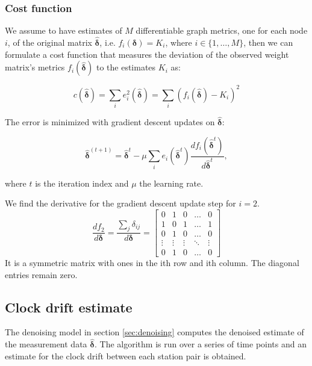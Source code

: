 \documentclass[12pt,a4paper,english]{article}
\begin{document}
\subsubsection{Cost function}
We assume to have estimates of $M$ differentiable graph metrics, one for each node $i$, of the original matrix $\bm{\hat{\delta}}$, i.e. $f_i(\bm{\delta}) = K_i$, where $i\in\{ 1,\dots, M \}$, then we can formulate a cost function that measures the deviation of the observed weight matrix's metrics $f_i(\bm{\hat{\delta}})$ to the estimates $K_i$ as: 

\begin{equation}
c(\bm{\hat{\delta}}) = \sum_i e_i^2(\bm{\hat{\delta}}) = \sum_i(f_i(\bm{\hat{\delta}})-K_i)^2
\end{equation}

The error is minimized with gradient descent updates on $\bm{\hat{\delta}}$: 

\begin{equation}
\bm{\hat{\delta}}^{(t+1)} = \bm{\hat{\delta}}^t-\mu\sum_i e_i(\bm{\hat{\delta}}^t)\frac{df_i(\bm{\hat{\delta}}^t)}{d\bm{\hat{\delta}}^t},
\label{eq:updates}
\end{equation}

where $t$ is the iteration index and $\mu$ the learning rate. %

We find the derivative for the gradient descent update step for $i=2$.
\begin{equation}
\frac{df_2}{d\bm{\delta}}=\frac{\sum_j\delta_{ij}}{d\bm{\delta}}=
\begin{bmatrix}
    0 & 1 & 0 & \dots  & 0 \\
    1 & 0 & 1 & \dots  & 1 \\
    0 & 1 & 0 & \dots  & 0 \\
    \vdots & \vdots & \vdots & \ddots & \vdots \\
    0 & 1 & 0 & \dots  & 0
\end{bmatrix}
\end{equation}
It is a symmetric matrix with ones in the ith row and ith column. The diagonal entries remain zero.


\subsection{Clock drift estimate}

The denoising model in section \ref{sec:denoising} computes the denoised estimate of the measurement data $\bm{\hat{\delta}}$. The algorithm is run over a series of time points and an estimate for the clock drift between each station pair is obtained. 
\end{document}
